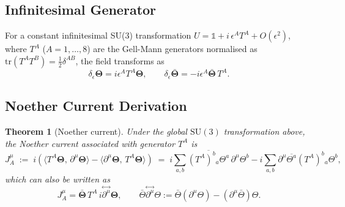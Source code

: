 \documentclass[12pt,a4paper]{article}
\newtheorem{theorem}{Theorem}[section]
\theoremstyle{remark}
\begin{document}
\subsection{Infinitesimal Generator}

For a constant infinitesimal SU(3) transformation
$U = \mathbb{1} + i\,\epsilon^A T^A + O(\epsilon^2)$, where $T^A$
($A=1,\ldots,8$) are the Gell-Mann generators normalised as
$\mathrm{tr}(T^A T^B)=\tfrac{1}{2}\delta^{AB}$, the field transforms as
\begin{equation}
  \delta_\epsilon\boldsymbol{\Theta}
  = i\epsilon^A T^A\boldsymbol{\Theta},
  \qquad
  \delta_\epsilon\bar{\boldsymbol{\Theta}}
  = -i\epsilon^A\bar{\boldsymbol{\Theta}}\,T^A.
\end{equation}

\subsection{Noether Current Derivation}

\begin{theorem}[Noether current]
  \label{thm:noether_current}
  Under the global $\mathrm{SU}(3)$ transformation above, the Noether current
  associated with generator $T^A$ is
  \begin{equation}
    \label{eq:noether_current}
    J_A^\mu
    \;:=\;
    i\!\left(
      \langle T^A\boldsymbol{\Theta},\,\partial^\mu\boldsymbol{\Theta}\rangle
      -
      \langle\partial^\mu\boldsymbol{\Theta},\,T^A\boldsymbol{\Theta}\rangle
    \right)
    \;=\;
    i\sum_{a,b}\overline{(T^A)^b{}_a\Theta^a}\,\partial^\mu\Theta^b
    - i\sum_{a,b}\partial^\mu\overline{\Theta^a}(T^A)^b{}_a\Theta^b,
  \end{equation}
  which can also be written as
  \begin{equation}
    J_A^\mu
    = \bar{\boldsymbol{\Theta}}\, T^A \,i\overset{\leftrightarrow}{\partial^\mu}\boldsymbol{\Theta},
    \qquad
    \bar{\Theta}\overset{\leftrightarrow}{\partial^\mu}\Theta
    := \bar\Theta(\partial^\mu\Theta) - (\partial^\mu\bar\Theta)\Theta.
  \end{equation}
\end{theorem}
\end{document}
